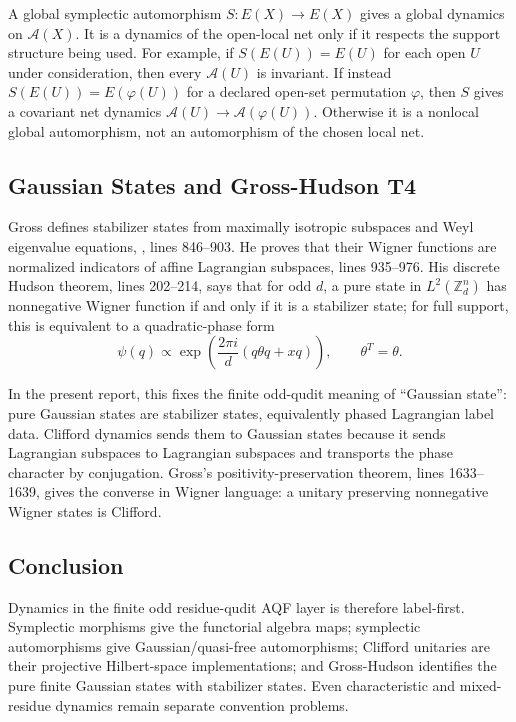 A global symplectic automorphism \(S:E(X)\to E(X)\) gives a global dynamics on
\(\mathcal A(X)\).  It is a dynamics of the open-local net only if it respects
the support structure being used.  For example, if \(S(E(U))=E(U)\) for each
open \(U\) under consideration, then every \(\mathcal A(U)\) is invariant.  If
instead \(S(E(U))=E(\varphi(U))\) for a declared open-set permutation
\(\varphi\), then \(S\) gives a covariant net dynamics
\(\mathcal A(U)\to\mathcal A(\varphi(U))\).  Otherwise it is a nonlocal global
automorphism, not an automorphism of the chosen local net.

\subsection{Gaussian States and Gross-Hudson T4}

Gross defines stabilizer states from maximally isotropic subspaces and Weyl
eigenvalue equations, , lines 846--903.  He proves that their
Wigner functions are normalized indicators of affine Lagrangian subspaces,
lines 935--976.  His discrete Hudson theorem, lines 202--214, says that for
odd \(d\), a pure state in \(L^2(\mathbb Z_d^n)\) has nonnegative Wigner
function if and only if it is a stabilizer state; for full support, this is
equivalent to a quadratic-phase form
\[
  \psi(q)\propto
  \exp\!\left(\frac{2\pi i}{d}(q\theta q+xq)\right),
  \qquad \theta^T=\theta .
\]

In the present report, this fixes the finite odd-qudit meaning of
``Gaussian state'': pure Gaussian states are stabilizer states, equivalently
phased Lagrangian label data.  Clifford dynamics sends them to Gaussian states
because it sends Lagrangian subspaces to Lagrangian subspaces and transports
the phase character by conjugation.  Gross's positivity-preservation theorem,
lines 1633--1639, gives the converse in Wigner language: a unitary preserving
nonnegative Wigner states is Clifford.

\subsection{Conclusion}

Dynamics in the finite odd residue-qudit AQF layer is therefore label-first.
Symplectic morphisms give the functorial algebra maps; symplectic
automorphisms give Gaussian/quasi-free automorphisms; Clifford unitaries are
their projective Hilbert-space implementations; and Gross-Hudson identifies
the pure finite Gaussian states with stabilizer states.  Even characteristic
and mixed-residue dynamics remain separate convention problems.
